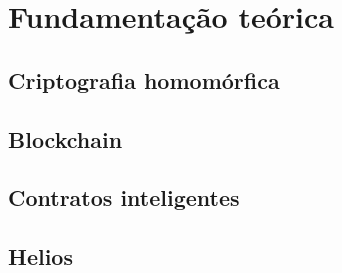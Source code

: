 \documentclass{ufsctex/ufsctex}
\begin{document}
\chapter{Fundamentação teórica}

\section{Criptografia homomórfica}

\section{Blockchain}

\section{Contratos inteligentes}

\section{Helios}




\end{document}
